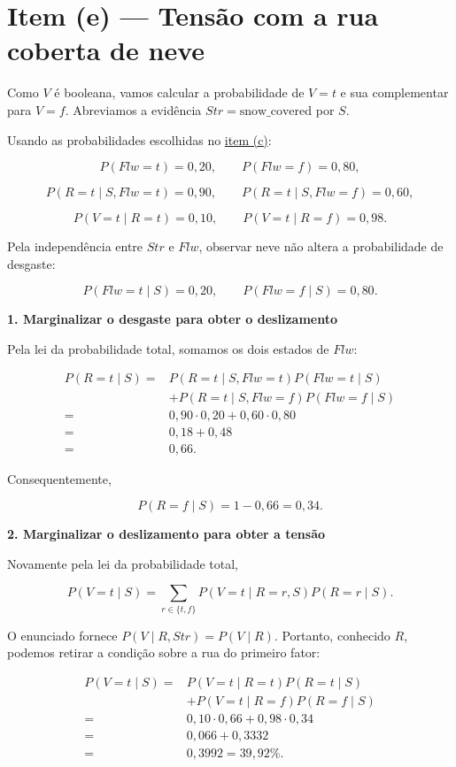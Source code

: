 \documentclass[11pt,a4paper]{article}
\newcommand{\itemtitle}[2]{\section*{\textcolor{accent}{Item (#1) --- #2}}}
\newcommand{\subtitulo}[1]{\par\medskip\textbf{\textcolor{accent}{#1}}\par}
\begin{document}
\clearpage
\itemtitle{e}{Tensão com a rua coberta de neve}\label{item-e}

Como \(V\) é booleana, vamos calcular a probabilidade de \(V=t\) e sua complementar para \(V=f\). Abreviamos a evidência \(Str=\text{snow\_covered}\) por \(S\).

Usando as probabilidades escolhidas no \hyperref[item-c]{item (c)}:

\[
P(Flw=t)=0{,}20,\qquad P(Flw=f)=0{,}80,
\]

\[
P(R=t\mid S,Flw=t)=0{,}90,\qquad
P(R=t\mid S,Flw=f)=0{,}60,
\]

\[
P(V=t\mid R=t)=0{,}10,\qquad
P(V=t\mid R=f)=0{,}98.
\]

Pela independência entre \(Str\) e \(Flw\), observar neve não altera a probabilidade de desgaste:

\[
P(Flw=t\mid S)=0{,}20,\qquad P(Flw=f\mid S)=0{,}80.
\]

\subtitulo{1. Marginalizar o desgaste para obter o deslizamento}\label{marginalizar-o-desgaste-para-obter-o-deslizamento}

Pela lei da probabilidade total, somamos os dois estados de \(Flw\):

\[
\begin{aligned}
P(R=t\mid S)
={}&P(R=t\mid S,Flw=t)P(Flw=t\mid S)\\
&+P(R=t\mid S,Flw=f)P(Flw=f\mid S)\\
={}&0{,}90\cdot0{,}20+0{,}60\cdot0{,}80\\
={}&0{,}18+0{,}48\\
={}&0{,}66.
\end{aligned}
\]

Consequentemente,

\[
P(R=f\mid S)=1-0{,}66=0{,}34.
\]

\subtitulo{2. Marginalizar o deslizamento para obter a tensão}\label{marginalizar-o-deslizamento-para-obter-a-tensuxe3o}

Novamente pela lei da probabilidade total,

\[
P(V=t\mid S)=\sum_{r\in\{t,f\}}P(V=t\mid R=r,S)P(R=r\mid S).
\]

O enunciado fornece \(P(V\mid R,Str)=P(V\mid R)\). Portanto, conhecido \(R\), podemos retirar a condição sobre a rua do primeiro fator:

\[
\begin{aligned}
P(V=t\mid S)
={}&P(V=t\mid R=t)P(R=t\mid S)\\
&+P(V=t\mid R=f)P(R=f\mid S)\\
={}&0{,}10\cdot0{,}66+0{,}98\cdot0{,}34\\
={}&0{,}066+0{,}3332\\
={}&\boxed{0{,}3992=39{,}92\%}.
\end{aligned}
\]
\end{document}
